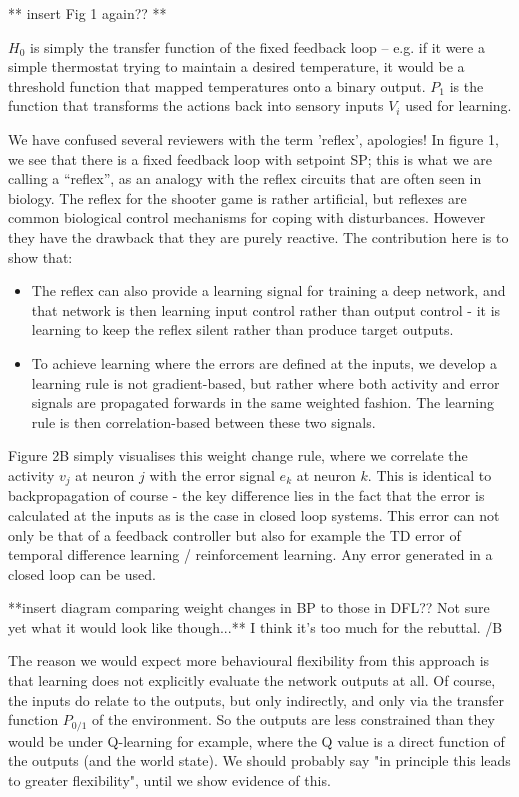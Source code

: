 \documentclass{article}
\begin{document}
	


		** insert Fig 1 again?? **
	
	$H_{0}$ is simply the transfer function of the fixed feedback loop – e.g. if it were a simple thermostat trying to maintain a desired temperature, it would be a threshold function that mapped temperatures onto a binary output. $P_{1}$ is the function that transforms the actions back into sensory inputs $V_{i}$ used for learning. 
	

		
	We have confused several reviewers with the term 'reflex', apologies! In figure 1, we see that there is a fixed feedback loop with setpoint SP; this is what we are calling a ``reflex'', as an analogy with the reflex circuits that are often seen in biology. The reflex for the shooter game is rather artificial, but reflexes are common biological control mechanisms for coping with disturbances. However they have the drawback that they are purely reactive. The contribution here is to show that:
	\begin{itemize}
		\item The reflex can also provide a learning signal for training a deep network, and that network is then learning input control rather than output control - it is learning to keep the reflex silent rather than produce target outputs.
		\item To achieve learning where the errors are defined at the inputs, we develop a learning rule is not gradient-based, but rather where both activity and error signals are propagated forwards in the same weighted fashion. The learning rule is then correlation-based between these two signals.
	\end{itemize}
	
	
		Figure 2B simply visualises this weight change rule, where we correlate the activity $v_{j}$ at neuron $j$ with the error signal $e_{k}$ at neuron $k$. This is identical to backpropagation of course - the key difference lies in the fact that the error is calculated at the inputs as is the case in closed loop systems. This error can not only be that of a feedback controller but also for example the TD error of temporal difference learning / reinforcement learning. Any error generated in a closed loop can be used.
		
		
		**insert diagram comparing weight changes in BP to those in DFL?? Not sure yet what it would look like though...**
                I think it's too much for the rebuttal. /B
		
		
	The reason we would expect more behavioural flexibility from this approach is that learning does not explicitly evaluate the network outputs at all. Of course, the inputs do relate to the outputs, but only indirectly, and only via the transfer function $P_{0/1}$ of the environment. So the outputs are less constrained than they would be under Q-learning for example, where the Q value is a direct function of the outputs (and the world state). We should probably say "in principle this leads to greater flexibility", until we show evidence of this. 
	
\end{document}
